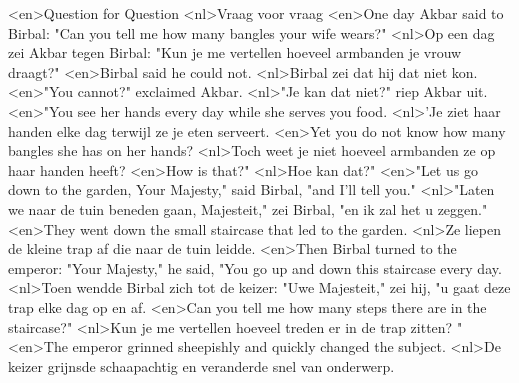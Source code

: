 <en>Question for Question
<nl>Vraag voor vraag
<en>One day Akbar said to Birbal: "Can you tell me how many bangles your wife wears?"
<nl>Op een dag zei Akbar tegen Birbal: "Kun je me vertellen hoeveel armbanden je vrouw draagt?"
<en>Birbal said he could not.
<nl>Birbal zei dat hij dat niet kon.
<en>"You cannot?" exclaimed Akbar.
<nl>"Je kan dat niet?" riep Akbar uit.
<en>"You see her hands every day while she serves you food.
<nl>'Je ziet haar handen elke dag terwijl ze je eten serveert.
<en>Yet you do not know how many bangles she has on her hands?
<nl>Toch weet je niet hoeveel armbanden ze op haar handen heeft?
<en>How is that?"
<nl>Hoe kan dat?"
<en>"Let us go down to the garden, Your Majesty," said Birbal, "and I'll tell you."
<nl>"Laten we naar de tuin beneden gaan, Majesteit," zei Birbal, "en ik zal het u zeggen."
<en>They went down the small staircase that led to the garden.
<nl>Ze liepen de kleine trap af die naar de tuin leidde.
<en>Then Birbal turned to the emperor: "Your Majesty," he said, "You go up and down this staircase every day.
<nl>Toen wendde Birbal zich tot de keizer: "Uwe Majesteit," zei hij, "u gaat deze trap  elke dag op en af.
<en>Can you tell me how many steps there are in the staircase?"
<nl>Kun je me vertellen hoeveel treden er in de trap zitten? "
<en>The emperor grinned sheepishly and quickly changed the subject.
<nl>De keizer grijnsde schaapachtig en veranderde snel van onderwerp.
